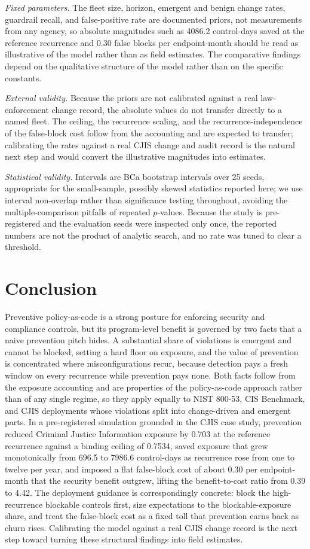 \documentclass[journal]{IEEEtran}
\begin{document}
\emph{Fixed parameters.} The fleet size, horizon, emergent and benign change rates, guardrail recall,
and false-positive rate are documented priors, not measurements from any agency, so absolute
magnitudes such as 4086.2 control-days saved at the reference recurrence and 0.30 false blocks per
endpoint-month should be read as illustrative of the model rather than as field estimates. The
comparative findings depend on the qualitative structure of the model rather than on the specific
constants.

\emph{External validity.} Because the priors are not calibrated against a real law-enforcement change
record, the absolute values do not transfer directly to a named fleet. The ceiling, the recurrence
scaling, and the recurrence-independence of the false-block cost follow from the accounting and are
expected to transfer; calibrating the rates against a real CJIS change and audit record is the
natural next step and would convert the illustrative magnitudes into estimates.

\emph{Statistical validity.} Intervals are BCa bootstrap intervals over 25 seeds, appropriate for
the small-sample, possibly skewed statistics reported here; we use interval non-overlap rather than
significance testing throughout, avoiding the multiple-comparison pitfalls of repeated $p$-values.
Because the study is pre-registered and the evaluation seeds were inspected only once, the reported
numbers are not the product of analytic search, and no rate was tuned to clear a threshold.

\section{Conclusion}
Preventive policy-as-code is a strong posture for enforcing security and compliance controls, but
its program-level benefit is governed by two facts that a naive prevention pitch hides. A substantial
share of violations is emergent and cannot be blocked, setting a hard floor on exposure, and the
value of prevention is concentrated where misconfigurations recur, because detection pays a fresh
window on every recurrence while prevention pays none. Both facts follow from the exposure
accounting and are properties of the policy-as-code approach rather than of any single regime, so
they apply equally to NIST 800-53, CIS Benchmark, and CJIS deployments whose violations split into
change-driven and emergent parts. In a pre-registered simulation grounded in the CJIS case study,
prevention reduced Criminal Justice Information exposure by 0.703 at the reference recurrence against
a binding ceiling of 0.7534, saved exposure that grew monotonically from 696.5 to 7986.6
control-days as recurrence rose from one to twelve per year, and imposed a flat false-block cost of
about 0.30 per endpoint-month that the security benefit outgrew, lifting the benefit-to-cost ratio
from 0.39 to 4.42. The deployment guidance is correspondingly concrete: block the high-recurrence
blockable controls first, size expectations to the blockable-exposure share, and treat the
false-block cost as a fixed toll that prevention earns back as churn rises. Calibrating the model
against a real CJIS change record is the next step toward turning these structural findings into
field estimates.
\end{document}
